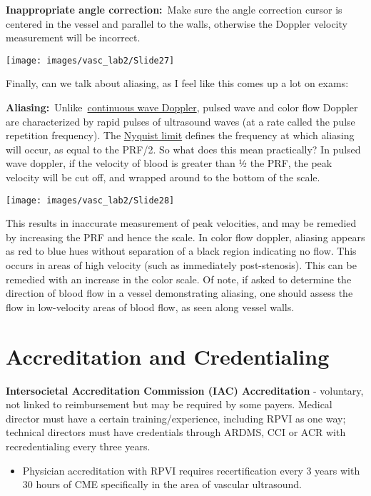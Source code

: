 \documentclass[
]{book}
\providecommand{\tightlist}{%
  \setlength{\itemsep}{0pt}\setlength{\parskip}{0pt}}
\begin{document}
\textbf{Inappropriate angle correction:}~Make sure the angle correction
cursor is centered in the vessel and parallel to the walls, otherwise
the Doppler velocity measurement will be incorrect.

\texttt{[image: images/vasc\_lab2/Slide27]}

Finally, can we talk about aliasing, as I feel like this comes up a lot
on exams:

\textbf{Aliasing:}~Unlike~\href{https://radiopaedia.org/articles/continuous-wave-doppler?lang=us}{continuous wave
Doppler},
pulsed wave and color flow Doppler are characterized by rapid pulses of
ultrasound waves (at a rate called the pulse repetition frequency). The
\href{https://radiopaedia.org/articles/nyquist-limit?lang=us}{Nyquist limit}
defines the frequency at which aliasing will occur, as equal to the
PRF/2. So what does this mean practically? In pulsed wave doppler, if
the velocity of blood is greater than ½ the PRF, the peak velocity will
be cut off, and wrapped around to the bottom of the scale.

\texttt{[image: images/vasc\_lab2/Slide28]}

This results in inaccurate measurement of peak velocities, and may be
remedied by increasing the PRF and hence the scale. In color flow
doppler, aliasing appears as red to blue hues without separation of a
black region indicating no flow. This occurs in areas of high velocity
(such as immediately post-stenosis). This can be remedied with an
increase in the color scale. Of note, if asked to determine the
direction of blood flow in a vessel demonstrating aliasing, one should
assess the flow in low-velocity areas of blood flow, as seen along
vessel walls.

\hypertarget{accreditation-and-credentialing}{%
\section{Accreditation and Credentialing}\label{accreditation-and-credentialing}}

\textbf{Intersocietal Accreditation Commission (IAC) Accreditation} -
voluntary, not linked to reimbursement but may be required by some
payers. Medical director must have a certain training/experience,
including RPVI as one way; technical directors must have credentials
through ARDMS, CCI or ACR with recredentialing every three
years.\citep{iac2021}

\begin{itemize}
\tightlist
\item
  Physician accreditation with RPVI requires recertification every 3
  years with 30 hours of CME specifically in the area of vascular
  ultrasound.
\end{itemize}
\end{document}
